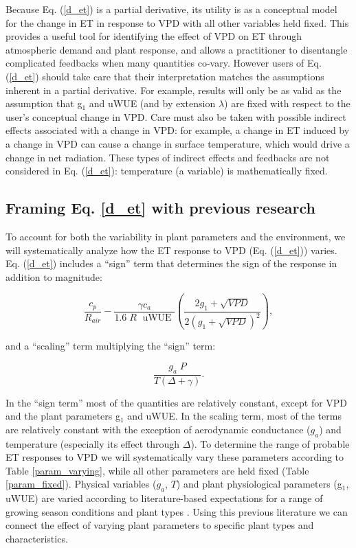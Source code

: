 \documentclass[draft]{agujournal2019}
\begin{document}
  Because Eq. (\ref{d_et}) is a partial derivative, its utility is as
  a conceptual model for the change in ET in response to VPD with all
  other variables held fixed. This provides a useful tool for
  identifying the effect of VPD on ET through atmospheric demand and
  plant response, and allows a practitioner to disentangle complicated
  feedbacks when many quantities co-vary. However users of
  Eq. (\ref{d_et}) should take care that their interpretation matches
  the assumptions inherent in a partial derivative. For example,
  results will only be as valid as the assumption that g$_1$ and uWUE
  (and by extension $\lambda$) are fixed with respect to the user's
  conceptual change in VPD. Care must also be taken with possible
  indirect effects associated with a change in VPD: for example, a
  change in ET induced by a change in VPD can cause a change in
  surface temperature, which would drive a change in net
  radiation. These types of indirect effects and feedbacks are not
  considered in Eq. (\ref{d_et}): temperature (a variable) is
  mathematically fixed.

\subsection{Framing Eq. \ref{d_et} with previous research }


  To account for both the variability in plant parameters and the
  environment, we will systematically analyze how the ET response to
  VPD (Eq. (\ref{d_et})) varies. Eq. (\ref{d_et}) includes a
  ``sign'' term that determines the sign of the response in addition
  to magnitude:

\begin{equation}
  \label{sign}
  \frac{c_p}{R_{air}} - \frac{\gamma c_a }{1.6 \; R\; \text{ uWUE }} \left( \frac{2 g_1 + \sqrt{VPD}}{2 (g_1 + \sqrt{VPD})^2}\right),
\end{equation}

and a ``scaling'' term multiplying the ``sign'' term:

\begin{equation}
  \frac{g_a \; P}{T(\Delta + \gamma)}.
\end{equation}

In the ``sign term'' most of the quantities are relatively constant,
except for VPD and the plant parameters g$_1$ and uWUE. In the scaling
term, most of the terms are relatively constant with the exception of
aerodynamic conductance ($g_a$) and temperature (especially its effect
through $\Delta$). To determine the range of probable ET responses to
VPD we will systematically vary these parameters according to Table
\ref{param_varying}, while all other parameters are held fixed (Table
\ref{param_fixed}). Physical variables ($g_a$, $T$) and plant
physiological parameters (g$_1$, uWUE) are varied according to
literature-based expectations for a range of growing season conditions
and plant types \cite{Zhou_2015, Medlyn_2017}. Using this previous
literature we can connect the effect of varying plant parameters to
specific plant types and characteristics.
\end{document}
